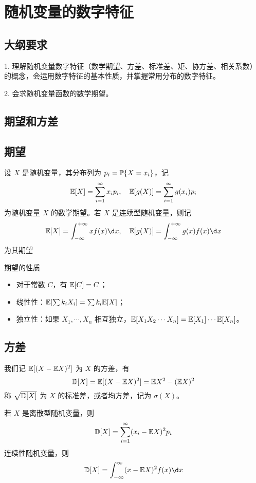 \section{随机变量的数字特征}

\subsection{大纲要求}

1. 理解随机变量数字特征（数学期望、方差、标准差、矩、协方差、相关系数）的概念，会运用数字特征的基本性质，并掌握常用分布的数字特征。

2. 会求随机变量函数的数学期望。

\subsection{期望和方差}

\subsection*{期望}

设 $X$ 是随机变量，其分布列为 $p_i = \mathbb{P}\{X = x_i\}$，记
\[ \mathbb{E} [X] = \sum_{i=1}^\infty x_i p_i, \quad \mathbb{E}[g(X)] = \sum_{i=1}^\infty g(x_i) p_i \]
为随机变量 $X$ 的数学期望。若 $X$ 是连续型随机变量，则记
\[ \bbE [X] = \int_{-\infty}^{+\infty} x f(x) \d x, \quad \bbE[g(X)] = \int_{-\infty}^{+\infty} g(x) f(x) \d x \]
为其期望

期望的性质
\begin{itemize}
	\item 对于常数 $C$，有 $\mathbb{E}[C] = C$；
	\item 线性性：$\mathbb{E}[\sum k_iX_i] = \sum k_i \mathbb{E} [X]$；
	\item 独立性：如果 $X_1, \cdots, X_n$ 相互独立，$\mathbb{E}[X_1X_2\cdots X_n] = \mathbb{E}[X_1] \cdots \mathbb{E}[X_n]$。
\end{itemize}

\subsection*{方差}

我们记 $\mathbb{E}[(X - \mathbb{E} X)^2]$ 为 $X$ 的方差，有
\[ \mathbb{D} [X] = \mathbb{E}[(X - \mathbb{E} X)^2] = \mathbb{E} X^2 - (\mathbb{E} X)^2 \]
称 $\sqrt{\mathbb{D} [X]}$ 为 $X$ 的标准差，或者均方差，记为 $\sigma(X)$。

若 $X$ 是离散型随机变量，则
\[ \mathbb{D} [X] = \sum_{i=1}^{\infty} (x_i - \mathbb{E} X)^2 p_i \]
连续性随机变量，则
\[ \bbD [X] = \int_{-\infty}^{\infty} (x-\bbE X)^2 f(x) \d x \]

